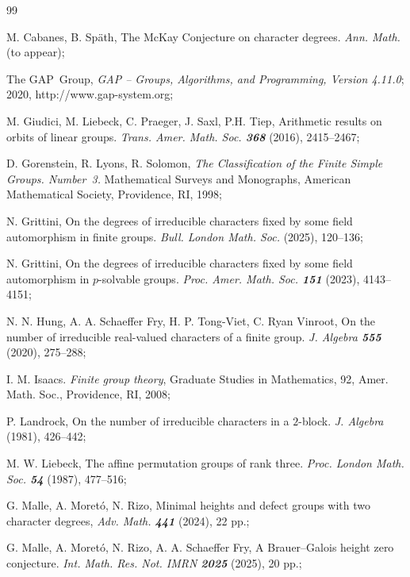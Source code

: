 	\begin{thebibliography}{99}
		
		 {\sc M. Cabanes, B. Späth}, The McKay Conjecture on character degrees. \emph{Ann. Math.} (to appear);
		
		{\sc The GAP~Group}, \emph{GAP -- Groups, Algorithms, and Programming, Version
			4.11.0}; 2020, {\sf http://www.gap-system.org};
		
		{\sc M. Giudici, M. Liebeck, C. Praeger, J. Saxl, P.H. Tiep}, Arithmetic
		results on orbits of linear groups. \emph{Trans. Amer. Math. Soc. \bf368}
		(2016), 2415--2467;
		
		{\sc D. Gorenstein, R. Lyons, R. Solomon}, \emph{The Classification of the
			Finite Simple Groups. Number~3.} Mathematical Surveys and Monographs,
		American Mathematical Society, Providence, RI, 1998;
		
		{\sc N. Grittini}, On the degrees of irreducible characters fixed by
		some field automorphism in finite groups. \emph{Bull. London Math. Soc.} (2025), 120--136;
		
		{\sc N. Grittini}, On the degrees of irreducible characters fixed by some field automorphism in $p$-solvable groups. \emph{Proc. Amer. Math. Soc. {\bf 151}} (2023), 4143--4151;
		
		{\sc N. N. Hung, A. A. Schaeffer Fry, H. P. Tong-Viet, C. Ryan Vinroot}, On the number of irreducible real-valued characters of a finite group. \emph{J. Algebra \bf555} (2020), 275--288;
		
		{\sc I. M. Isaacs}. \emph{Finite group theory}, Graduate Studies in Mathematics, 92, Amer. Math. Soc., Providence, RI, 2008;
		
		{\sc P. Landrock}, On the number of irreducible characters in a $2$-block. \emph{J. Algebra} (1981), 426--442;
		
		{\sc M. W. Liebeck}, The affine permutation groups of rank three. \emph{Proc.
			London Math. Soc. {\bf54}} (1987), 477--516;
		
		 {\sc G. Malle, A. Moretó, N. Rizo}, Minimal heights and defect groups with two character degrees, \emph{Adv. Math. {\bf 441}} (2024), 22 pp.;
		
		{\sc G. Malle, A. Moret\'o, N. Rizo, A. A. Schaeffer Fry}, A Brauer--Galois height zero conjecture. \emph{Int. Math. Res. Not. IMRN {\bf 2025}} (2025), 20 pp.;
		

\end{thebibliography}
